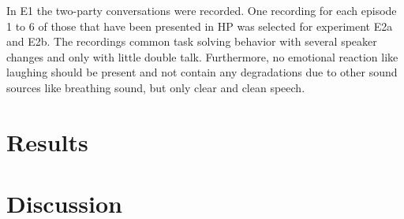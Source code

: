 In E1 the two-party conversations were recorded.
One recording for each episode 1 to 6 of those that have been presented in \ac{HP} was selected for experiment E2a and E2b.
The recordings common task solving behavior with several speaker changes and only with little double talk.
Furthermore, no emotional reaction like laughing should be present and not contain any degradations due to other sound sources like breathing sound, but only clear and clean speech.





























 

\section{Results}
\section{Discussion}